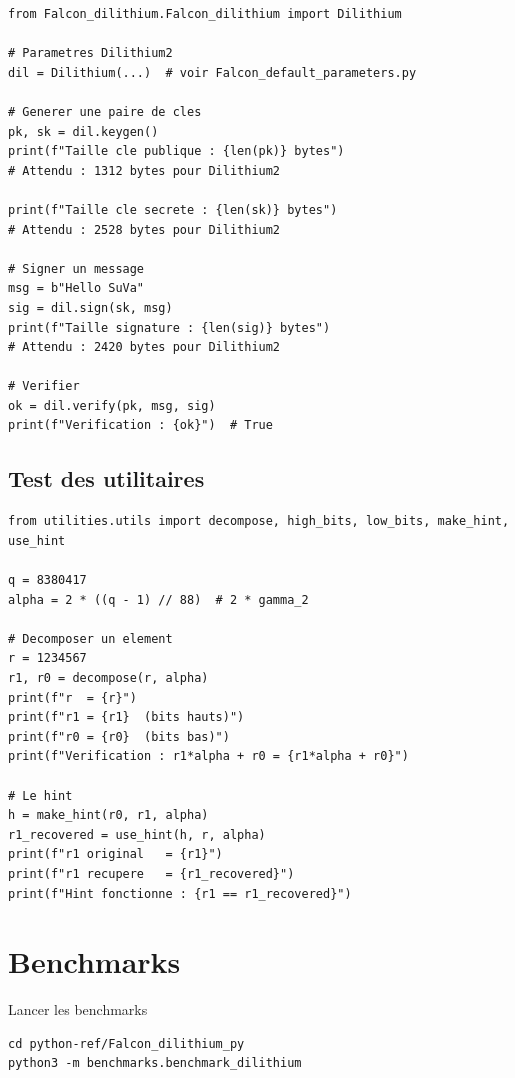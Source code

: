 \documentclass[12pt, a4paper]{article}
\begin{document}
\begin{lstlisting}[style=python]
from Falcon_dilithium.Falcon_dilithium import Dilithium

# Parametres Dilithium2
dil = Dilithium(...)  # voir Falcon_default_parameters.py

# Generer une paire de cles
pk, sk = dil.keygen()
print(f"Taille cle publique : {len(pk)} bytes")
# Attendu : 1312 bytes pour Dilithium2

print(f"Taille cle secrete : {len(sk)} bytes")
# Attendu : 2528 bytes pour Dilithium2

# Signer un message
msg = b"Hello SuVa"
sig = dil.sign(sk, msg)
print(f"Taille signature : {len(sig)} bytes")
# Attendu : 2420 bytes pour Dilithium2

# Verifier
ok = dil.verify(pk, msg, sig)
print(f"Verification : {ok}")  # True
\end{lstlisting}

\subsection{Test des utilitaires}

\begin{lstlisting}[style=python]
from utilities.utils import decompose, high_bits, low_bits, make_hint, use_hint

q = 8380417
alpha = 2 * ((q - 1) // 88)  # 2 * gamma_2

# Decomposer un element
r = 1234567
r1, r0 = decompose(r, alpha)
print(f"r  = {r}")
print(f"r1 = {r1}  (bits hauts)")
print(f"r0 = {r0}  (bits bas)")
print(f"Verification : r1*alpha + r0 = {r1*alpha + r0}")

# Le hint
h = make_hint(r0, r1, alpha)
r1_recovered = use_hint(h, r, alpha)
print(f"r1 original   = {r1}")
print(f"r1 recupere   = {r1_recovered}")
print(f"Hint fonctionne : {r1 == r1_recovered}")
\end{lstlisting}

\section{Benchmarks}

\begin{cmdbox}{Lancer les benchmarks}
\begin{lstlisting}[style=bash]
cd python-ref/Falcon_dilithium_py
python3 -m benchmarks.benchmark_dilithium
\end{lstlisting}
\end{cmdbox}
\end{document}
